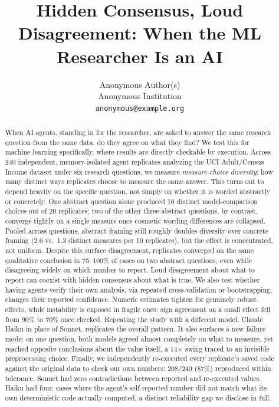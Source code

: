 \documentclass{article}
\title{Hidden Consensus, Loud Disagreement: When the ML \\ Researcher Is an AI}
\author{%
  Anonymous Author(s) \\
  Anonymous Institution \\
  \texttt{anonymous@example.org} \\
}
\begin{document}
\maketitle

\begin{abstract}
When AI agents, standing in for the researcher, are asked to answer the same research
question from the same data, do they agree on what they find? We test this for machine
learning specifically, where results are directly checkable by execution. Across 240
independent, memory-isolated agent replicates analyzing the UCI Adult/Census Income
dataset under six research questions, we measure \emph{measure-choice diversity}: how many
distinct ways replicates choose to measure the same answer. This turns out to depend
heavily on the specific question, not simply on whether it is worded abstractly or
concretely. One abstract question alone produced 10 distinct model-comparison choices out
of 20 replicates; two of the other three abstract questions, by contrast, converge tightly
on a single measure once cosmetic wording differences are collapsed. Pooled across
questions, abstract framing still roughly doubles diversity over concrete framing (2.6 vs.\
1.3 distinct measures per 10 replicates), but the effect is concentrated, not uniform.
Despite this surface disagreement, replicates converged on the same qualitative conclusion
in 75--100\% of cases on two abstract questions, even while disagreeing widely on which
number to report. Loud disagreement about what to report can coexist with hidden consensus
about what is true. We also test whether having agents verify their own analysis, via
repeated cross-validation or bootstrapping, changes their reported confidence. Numeric
estimates tighten for genuinely robust effects, while instability is exposed in fragile
ones: sign agreement on a small effect fell from 90\% to 70\% once checked. Repeating the
study with a different model, Claude Haiku in place of Sonnet, replicates the overall
pattern. It also surfaces a new failure mode: on one question, both models agreed almost
completely on what to measure, yet reached opposite conclusions about the value itself, a
14$\times$ swing traced to an invisible preprocessing choice. Finally, we independently
re-executed every replicate's saved code against the original data to check our own
numbers: 208/240 (87\%) reproduced within tolerance. Sonnet had zero contradictions between
reported and re-executed values. Haiku had four: cases where the agent's self-reported
number did not match what its own
deterministic code actually computed, a distinct reliability gap we disclose in full.
\end{abstract}
\end{document}

